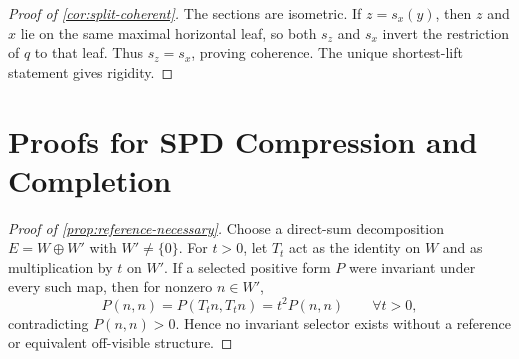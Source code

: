 \documentclass[10pt]{article}
\theoremstyle{plain}
\theoremstyle{definition}
\theoremstyle{remark}
\begin{document}
\begin{proof}[Proof of \cref{cor:split-coherent}]
The sections are isometric.  If \(z=s_x(y)\), then \(z\) and \(x\) lie on
the same maximal horizontal leaf, so both \(s_z\) and \(s_x\) invert the
restriction of \(q\) to that leaf.  Thus \(s_z=s_x\), proving coherence.
The unique shortest-lift statement gives rigidity.
\end{proof}

\section{Proofs for SPD Compression and Completion}
\label{app:spd-proofs}

\begin{proof}[Proof of \cref{prop:reference-necessary}]
Choose a direct-sum decomposition \(E=W\oplus W'\) with \(W'\ne\{0\}\).
For \(t>0\), let \(T_t\) act as the identity on \(W\) and as multiplication
by \(t\) on \(W'\).  If a selected positive form \(P\) were invariant under
every such map, then for nonzero \(n\in W'\),
\[
  P(n,n)=P(T_tn,T_tn)=t^2P(n,n)
  \qquad\forall t>0,
\]
contradicting \(P(n,n)>0\).  Hence no invariant selector exists without a
reference or equivalent off-visible structure.
\end{proof}
\end{document}
